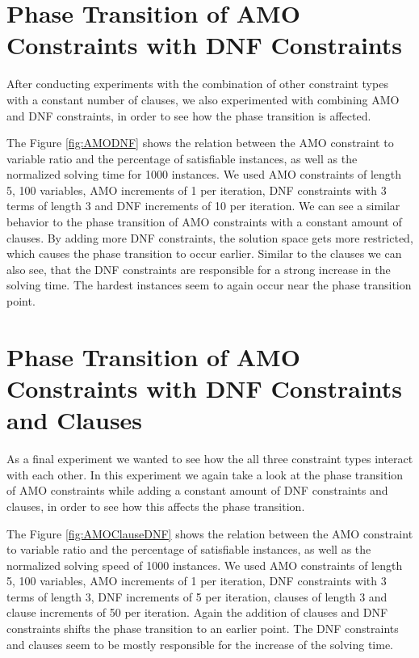 \section{Phase Transition of AMO Constraints with DNF Constraints}

After conducting experiments with the combination of other constraint types with a constant number of clauses, we also experimented with combining AMO and DNF constraints, in order to see how the phase transition is affected.



The Figure \ref{fig:AMODNF} shows the relation between the AMO constraint to variable ratio and the percentage of satisfiable instances, as well as the normalized solving time for 1000 instances. We used AMO constraints of length 5, 100 variables, AMO increments of 1 per iteration, DNF constraints with 3 terms of length 3 and DNF increments of 10 per iteration. We can see a similar behavior to the phase transition of AMO constraints with a constant amount of clauses. By adding more DNF constraints, the solution space gets more restricted, which causes the phase transition to occur earlier. Similar to the clauses we can also see, that the DNF constraints are responsible for a strong increase in the solving time. The hardest instances seem to again occur near the phase transition point.

\section{Phase Transition of AMO Constraints with DNF Constraints and Clauses}

As a final experiment we wanted to see how the all three constraint types interact with each other. In this experiment we again take a look at the phase transition of AMO constraints while adding a constant amount of DNF constraints and clauses, in order to see how this affects the phase transition.




The Figure \ref{fig:AMOClauseDNF} shows the relation between the AMO constraint to variable ratio and the percentage of satisfiable instances, as well as the normalized solving speed of 1000 instances. We used AMO constraints of length 5, 100 variables, AMO increments of 1 per iteration, DNF constraints with 3 terms of length 3, DNF increments of 5 per iteration, clauses of length 3 and clause increments of 50 per iteration. Again the addition of clauses and DNF constraints shifts the phase transition to an earlier point. The DNF constraints and clauses seem to be mostly responsible for the increase of the solving time.


